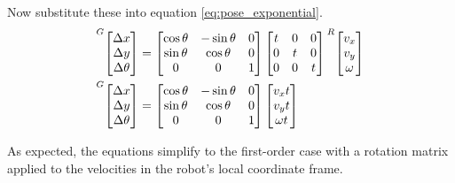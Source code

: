 Now substitute these into equation \eqref{eq:pose_exponential}.
\begin{align*}
  \prescript{G}{}{\begin{bmatrix}
    \Delta x \\
    \Delta y \\
    \Delta \theta
  \end{bmatrix}} &=
  \begin{bmatrix}
    \cos\theta & -\sin\theta & 0 \\
    \sin\theta &  \cos\theta & 0 \\
             0 &           0 & 1
  \end{bmatrix}
  \begin{bmatrix}
    t & 0 & 0 \\
    0 & t & 0 \\
    0 & 0 & t
  \end{bmatrix}
  \prescript{R}{}{\begin{bmatrix}
    v_x \\
    v_y \\
    \omega
  \end{bmatrix}} \\
  \prescript{G}{}{\begin{bmatrix}
    \Delta x \\
    \Delta y \\
    \Delta \theta
  \end{bmatrix}} &=
  \begin{bmatrix}
    \cos\theta & -\sin\theta & 0 \\
    \sin\theta &  \cos\theta & 0 \\
             0 &           0 & 1
  \end{bmatrix}
  \begin{bmatrix}
    v_x t \\
    v_y t \\
    \omega t
  \end{bmatrix}
\end{align*}

As expected, the equations simplify to the first-order case with a rotation
matrix applied to the velocities in the robot's local coordinate frame.

